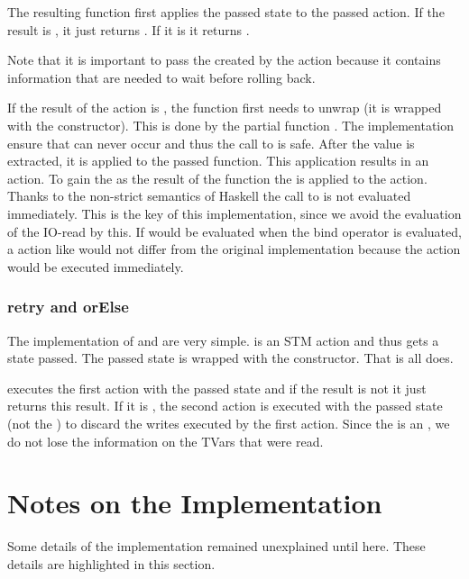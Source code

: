 The resulting function first applies the passed state to the passed action. 
If the result is , it just returns . If it is
 it returns . 

Note that it is important to 
pass the  created by the action because it contains information that
are needed to wait before rolling back. 

If the result of the action is 
, the function first needs to unwrap  (it is wrapped with 
the  constructor). This is done by the partial function . The
implementation ensure that  can never occur and thus the call to 
 is safe. After the value is extracted, it is applied to the passed 
function. This application results in an  action. To gain the  as 
the result of the function the  is applied to the action.
Thanks to the non-strict semantics of Haskell the call to  is not evaluated 
immediately. This is the key of this implementation, since we avoid the evaluation of 
the IO-read by this. If  would be evaluated when the bind operator is evaluated,
a action like  would not differ from the original implementation
because the  action would be executed immediately. 

\subsubsection{retry and orElse}
The implementation of  and  are very simple.  is an 
STM action and thus gets a state passed. The passed state is wrapped with the  constructor.
That is all  does. 

 executes the first action with the passed state and if the result is not 
 it just returns this result. If it is ,
the second action is executed with the passed state (not the ) to discard the 
writes executed by the first action. Since the  is an , 
we do not lose the information on the TVars that were read. 



\section{Notes on the Implementation}
Some details of the implementation remained unexplained until here. These details are highlighted
in this section.

